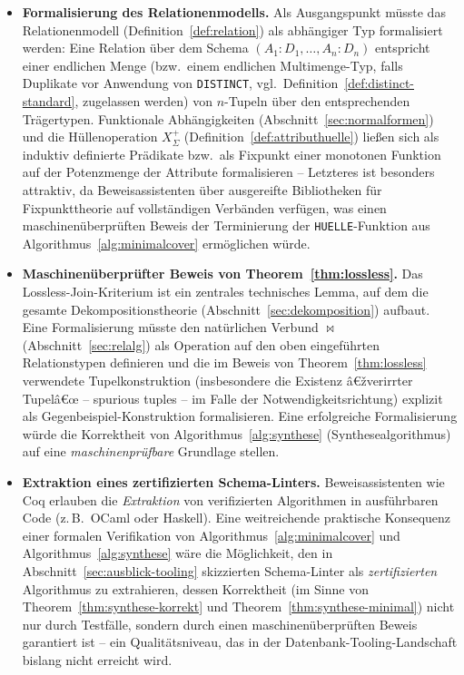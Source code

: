 ﻿\documentclass[a4paper,12pt]{report}
\theoremstyle{definition}
\theoremstyle{remark}
\begin{document}
\begin{itemize}
  \item \textbf{Formalisierung des Relationenmodells.} Als
    Ausgangspunkt müsste das Relationenmodell
    (Definition~\ref{def:relation}) als abhängiger Typ formalisiert
    werden: Eine Relation über dem Schema $(A_1{:}D_1,\ldots,A_n{:}D_n)$
    entspricht einer endlichen Menge (bzw.\ einem endlichen
    Multimenge-Typ, falls Duplikate vor Anwendung von
    \texttt{DISTINCT}, vgl.\ Definition~\ref{def:distinct-standard},
    zugelassen werden) von $n$-Tupeln über den entsprechenden
    Trägertypen. Funktionale Abhängigkeiten
    (Abschnitt~\ref{sec:normalformen}) und die Hüllenoperation
    $X^+_\Sigma$ (Definition~\ref{def:attributhuelle}) ließen sich
    als induktiv definierte Prädikate bzw.\ als Fixpunkt einer
    monotonen Funktion auf der Potenzmenge der Attribute formalisieren
    -- Letzteres ist besonders attraktiv, da Beweisassistenten über
    ausgereifte Bibliotheken für Fixpunkttheorie auf vollständigen
    Verbänden verfügen, was einen maschinenüberprüften Beweis der
    Terminierung der \texttt{HUELLE}-Funktion aus
    Algorithmus~\ref{alg:minimalcover} ermöglichen würde.

  \item \textbf{Maschinenüberprüfter Beweis von
    Theorem~\ref{thm:lossless}.} Das
    Lossless-Join-Kriterium ist ein zentrales technisches Lemma, auf
    dem die gesamte Dekompositionstheorie
    (Abschnitt~\ref{sec:dekomposition}) aufbaut. Eine Formalisierung
    müsste den natürlichen Verbund $\Join$
    (Abschnitt~\ref{sec:relalg}) als Operation auf den oben
    eingeführten Relationstypen definieren und die im
    Beweis von Theorem~\ref{thm:lossless} verwendete
    Tupelkonstruktion (insbesondere die Existenz â€žverirrter
    Tupelâ€œ -- spurious tuples -- im Falle der Notwendigkeitsrichtung)
    explizit als Gegenbeispiel-Konstruktion formalisieren. Eine
    erfolgreiche Formalisierung würde die Korrektheit von
    Algorithmus~\ref{alg:synthese} (Synthesealgorithmus) auf eine
    \emph{maschinenprüfbare} Grundlage stellen.

  \item \textbf{Extraktion eines zertifizierten
    Schema-Linters.} Beweisassistenten wie Coq erlauben die
    \emph{Extraktion} von verifizierten Algorithmen in
    ausführbaren Code (z.\,B.\ OCaml oder Haskell). Eine
    weitreichende praktische Konsequenz einer formalen Verifikation
    von Algorithmus~\ref{alg:minimalcover} und
    Algorithmus~\ref{alg:synthese} wäre die Möglichkeit, den in
    Abschnitt~\ref{sec:ausblick-tooling} skizzierten Schema-Linter
    als \emph{zertifizierten} Algorithmus zu extrahieren, dessen
    Korrektheit (im Sinne von
    Theorem~\ref{thm:synthese-korrekt} und
    Theorem~\ref{thm:synthese-minimal}) nicht nur durch
    Testfälle, sondern durch einen maschinenüberprüften Beweis
    garantiert ist -- ein Qualitätsniveau, das in der
    Datenbank-Tooling-Landschaft bislang nicht erreicht wird.


\end{itemize}
\end{document}

